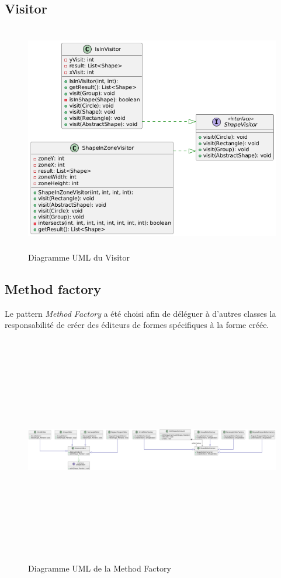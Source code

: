 \documentclass{article}
\begin{document}
\subsection{Visitor}

\begin{figure}[h]
    \centering
    \includegraphics[width=\textwidth,height=10.0cm,keepaspectratio]{visitor.png}
    \caption{Diagramme UML du Visitor}
    \label{Visitor}
\end{figure}
\FloatBarrier
\subsection{Method factory}
Le pattern \textit{Method Factory} a été choisi afin de déléguer à d'autres classes la responsabilité de créer des éditeurs de formes
spécifiques à la forme créée.
\begin{figure}[h]
    \centering
    \includegraphics[width=\textwidth,height=10.0cm,keepaspectratio]{methodFactory.png}
    \caption{Diagramme UML de la Method Factory}
    \label{MethodFactory}
\end{figure}
\FloatBarrier
\end{document}
